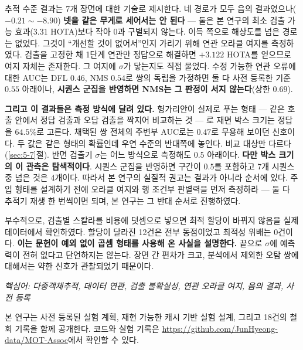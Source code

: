 \documentclass[12pt,a4paper,oneside]{report}
\begin{document}
추적 수준 결과는 7개 장면에 대한 기술로 제시한다. 네 경로가 모두 음의 결과였으나($-0.21 \sim -8.90$) \textbf{넷을 같은 무게로 세어서는 안 된다} --- 둘은 본 연구의 최소 검출 가능 효과($3.31$ HOTA)보다 작아 $0$과 구별되지 않는다. 이득 쪽으로 해상도를 넘은 경로는 없었다. 그것이 ``개선할 것이 없어서''인지 가리기 위해 연관 오라클 여지를 측정하였다. 검출을 고정한 채 1단계 연관만 정답으로 해결하면 $+3.122$ HOTA를 얻으므로 여지 자체는 존재한다. 그 여지에 $\sigma$가 닿는지도 직접 물었다. 수정 가능한 연관 오류에 대한 AUC는 DFL $0.46$, NMS $0.54$로 쌍의 독립을 가정하면 둘 다 사전 등록한 기준 $0.55$ 아래이나, \textbf{시퀀스 군집을 반영하면 NMS는 그 판정이 서지 않는다}(상한 $0.69$).

\textbf{그리고 이 결과들은 측정 방식에 달려 있다.} 헝가리안이 실제로 푸는 형태 --- 같은 호출 안에서 정답 검출과 오답 검출을 짝지어 비교하는 것 --- 로 재면 박스 크기는 정답을 $64.5\%$로 고른다. 채택된 쌍 전체의 주변부 AUC로는 $0.47$로 무용해 보이던 신호이다. 두 값은 같은 형태의 확률인데 우연 수준의 반대쪽에 놓인다. 비교 대상만 다르다(\ref{sec:5-7}절). 반면 검출기 $\sigma$는 어느 방식으로 측정해도 $0.5$ 아래이다. \textbf{다만 박스 크기의 이 관측은 탐색적이다}. 시퀀스 군집을 반영하면 구간이 $0.5$를 포함하고 7개 시퀀스 중 넘은 것은 4개이다. 따라서 본 연구의 실질적 권고는 결과가 아니라 순서에 있다. 주입 형태를 설계하기 전에 오라클 여지와 행 조건부 판별력을 먼저 측정하라 --- 둘 다 추적기 재생 한 번씩이면 되며, 본 연구는 그 반대 순서로 진행하였다.

부수적으로, 검출별 스칼라를 비용에 덧셈으로 넣으면 최적 할당이 바뀌지 않음을 실제 데이터에서 확인하였다. 할당이 달라진 12건은 전부 동점이었고 최적성 위배는 0건이다. \textbf{이는 문헌이 예외 없이 곱셈 형태를 사용해 온 사실을 설명한다.} 끝으로 $\sigma$에 예측력이 전혀 없다고 단언하지는 않는다. 장면 간 편차가 크고, 분석에서 제외한 오탐 쌍에 대해서는 약한 신호가 관찰되었기 때문이다.

\vspace{0.3cm}
\noindent\textit{핵심어: 다중객체추적, 데이터 연관, 검출 불확실성, 연관 오라클 여지, 음의 결과, 사전 등록}

\vspace{0.2cm}
\noindent 본 연구는 사전 등록된 실험 계획, 재현 가능한 캐시 기반 실험 설계, 그리고 18건의 철회 기록을 함께 공개한다. 코드와 실험 기록은 \url{https://github.com/JunHyeong-data/MOT-Assoc}에서 확인할 수 있다.

\end{document}

